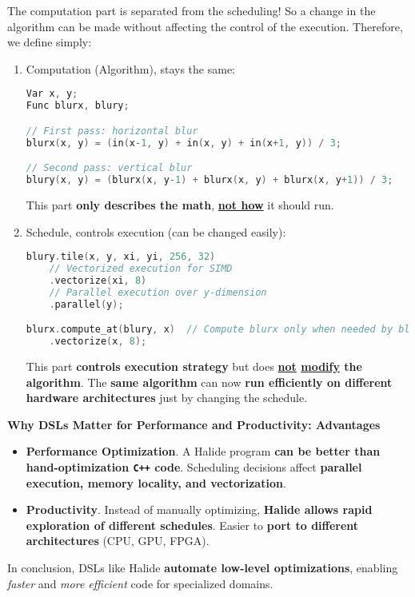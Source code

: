 \begin{itemize}
   \begin{examplebox}
      The computation part is separated from the scheduling!
      So a change in the algorithm can be made without affecting the control of the execution.
      Therefore, we define simply:
      \begin{enumerate}
         \item Computation (Algorithm), stays the same:
         \begin{lstlisting}[language=c++]
Var x, y;
Func blurx, blury;

// First pass: horizontal blur
blurx(x, y) = (in(x-1, y) + in(x, y) + in(x+1, y)) / 3;

// Second pass: vertical blur
blury(x, y) = (blurx(x, y-1) + blurx(x, y) + blurx(x, y+1)) / 3;\end{lstlisting}
         This part \textbf{only describes the math}, \textbf{\underline{not how}} it should run.
      
         \item Schedule, controls execution (can be changed easily):
         \begin{lstlisting}[language=c++]
blury.tile(x, y, xi, yi, 256, 32)
    // Vectorized execution for SIMD
    .vectorize(xi, 8)
    // Parallel execution over y-dimension
    .parallel(y);

blurx.compute_at(blury, x)  // Compute blurx only when needed by blury
    .vectorize(x, 8);\end{lstlisting}
         This part \textbf{controls execution strategy} but does \textbf{\underline{not} \underline{modify} the algorithm}.
         The \textbf{same algorithm} can now \textbf{run efficiently on different hardware architectures} just by changing the schedule.
      \end{enumerate}
   \end{examplebox}
\end{itemize}

\highspace
\begin{flushleft}
   \textcolor{Green3}{ \textbf{Why DSLs Matter for Performance and Productivity: Advantages}}
\end{flushleft}
\begin{itemize}[label=\textcolor{Green3}{}]
   \item \textcolor{Green3}{\textbf{Performance Optimization}}. A Halide program \textbf{can be better than hand-optimization \texttt{C++} code}. Scheduling decisions affect \textbf{parallel execution, memory locality, and vectorization}.
   \item \textcolor{Green3}{\textbf{Productivity}}. Instead of manually optimizing, \textbf{Halide allows rapid exploration of different schedules}. Easier to \textbf{port to different architectures} (CPU, GPU, FPGA).
\end{itemize}
In conclusion, DSLs like Halide \textbf{automate low-level optimizations}, enabling \emph{faster} and \emph{more efficient} code for specialized domains.
